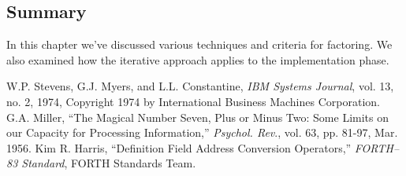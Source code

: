 \subsection{Summary}
In this chapter we've discussed various techniques and criteria for
factoring. We also examined how the iterative approach applies to the
implementation phase.

\begin{references}{9}
 W.P. Stevens, G.J. Myers, and L.L. Constantine,
\emph{ IBM Systems Journal}, vol. 13, no. 2, 1974, Copyright 1974 by
International Business Machines Corporation.
 G.A. Miller, ``The Magical Number Seven, Plus or
Minus Two: Some Limits on our Capacity for Processing Information,''
\emph{Psychol. Rev}., vol. 63, pp. 81-97, Mar. 1956.
 Kim R. Harris, ``Definition Field Address
Conversion Operators,'' \emph{FORTH--83 Standard}, FORTH Standards
Team.
\end{references}

